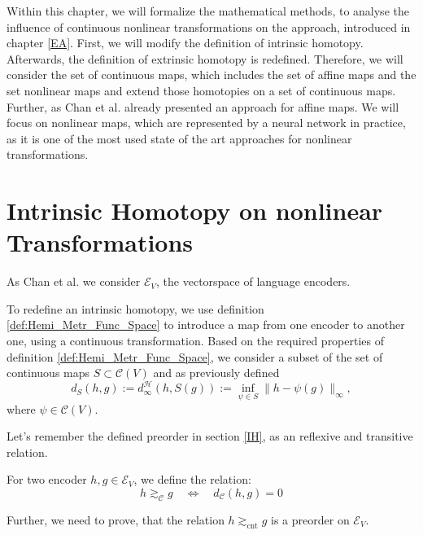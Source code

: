 Within this chapter, we will formalize the mathematical methods, to analyse the influence of continuous nonlinear transformations on the approach, introduced in chapter \ref{EA}.
First, we will modify the definition of intrinsic homotopy.
Afterwards, the definition of extrinsic homotopy is redefined. 
Therefore, we will consider the set of continuous maps, which includes the set of affine maps and the set nonlinear maps and extend those homotopies on a set of continuous maps.
Further, as Chan et al. \cite{chan_affine_2024} already presented an approach for affine maps.
We will focus on nonlinear maps, which are represented by a neural network in practice, as it is one of the most used state of the art approaches for nonlinear transformations.


\section{Intrinsic Homotopy on nonlinear Transformations}
As Chan et al. \cite{chan_affine_2024} we consider $\mathcal{E}_V$, the vectorspace of language encoders.

To redefine an intrinsic homotopy, we use definition \ref{def:Hemi_Metr_Func_Space} to introduce a map from one encoder to another one, using a continuous transformation.
Based on the required properties of definition \ref{def:Hemi_Metr_Func_Space}, we consider a subset of the set of continuous maps $S\subset \mathcal{C}(V)$ and as previously defined \[d_S(h,g):=d_\infty^\mathcal{H}(h,S(g)):= \inf_{\psi \in S} \|h-\psi(g)\|_\infty,\] where $\psi \in \mathcal{C}(V)$. 

Let's remember the defined preorder in section \ref{IH}, as an reflexive and transitive relation. 

\begin{definition} For two encoder $h,g \in \mathcal{E}_V$, we define the relation:
\[  h \gtrsim_\mathcal{C} g \quad \Leftrightarrow \quad d_\mathcal{C}(h,g)=0 \]
\end{definition}

Further, we need to prove, that the relation $h \gtrsim_{\text{cnt}} g$ is a preorder on $\mathcal{E}_V$.

